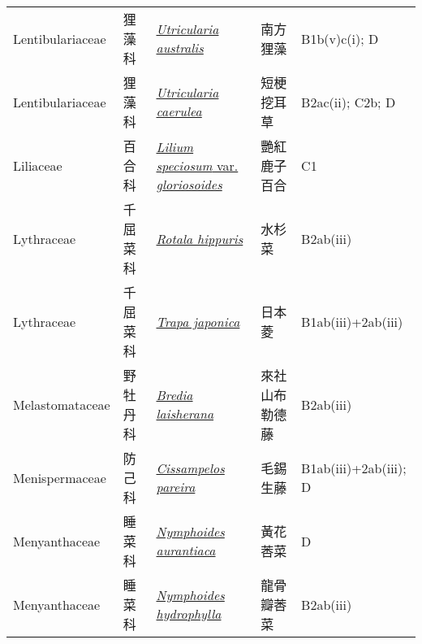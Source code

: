 {\begin{longtable}{L{2.5cm}L{2cm}L{5cm}L{2.5cm}L{3cm}}
    Lentibulariaceae & 狸藻科 & \href{http://www.theplantlist.org/tpl1.1/search?q=Utricularia+australis}{\textit{Utricularia australis} } & 南方狸藻 & B1b(v)c(i); D    \\
    Lentibulariaceae & 狸藻科 & \href{http://www.theplantlist.org/tpl1.1/search?q=Utricularia+caerulea}{\textit{Utricularia caerulea} } & 短梗挖耳草 & B2ac(ii); C2b; D    \\
    Liliaceae & 百合科 & \href{http://www.theplantlist.org/tpl1.1/search?q=Lilium+speciosum+var.+gloriosoides}{\textit{Lilium speciosum} var. \textit{gloriosoides} } & 艷紅鹿子百合 & C1    \\
    Lythraceae & 千屈菜科 & \href{http://www.theplantlist.org/tpl1.1/search?q=Rotala+hippuris}{\textit{Rotala hippuris} } & 水杉菜 & B2ab(iii)    \\
    Lythraceae & 千屈菜科 & \href{http://www.theplantlist.org/tpl1.1/search?q=Trapa+japonica}{\textit{Trapa japonica} } & 日本菱 & B1ab(iii)+2ab(iii)    \\
    Melastomataceae & 野牡丹科 & \href{http://www.theplantlist.org/tpl1.1/search?q=Bredia+laisherana}{\textit{Bredia laisherana} } & 來社山布勒德藤 & B2ab(iii)    \\
    Menispermaceae & 防己科 & \href{http://www.theplantlist.org/tpl1.1/search?q=Cissampelos+pareira}{\textit{Cissampelos pareira} } & 毛錫生藤 & B1ab(iii)+2ab(iii); D    \\
    Menyanthaceae & 睡菜科 & \href{http://www.theplantlist.org/tpl1.1/search?q=Nymphoides+aurantiaca}{\textit{Nymphoides aurantiaca} } & 黃花莕菜 & D    \\
    Menyanthaceae & 睡菜科 & \href{http://www.theplantlist.org/tpl1.1/search?q=Nymphoides+hydrophylla}{\textit{Nymphoides hydrophylla} } & 龍骨瓣莕菜 & B2ab(iii)    \\

\end{longtable}}
